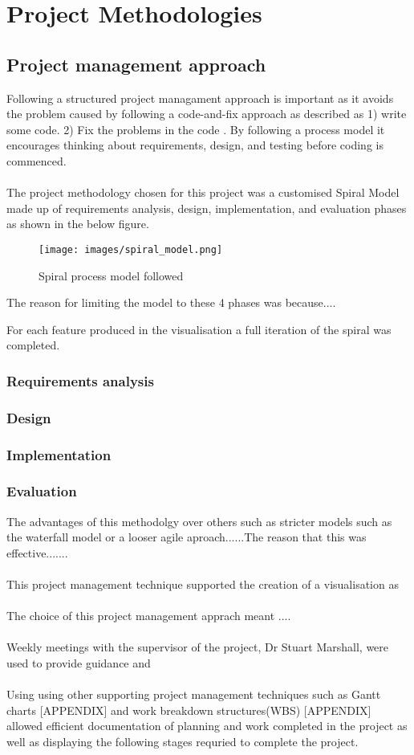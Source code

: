 
\chapter{Project Methodologies}\label{C:m}

\section{Project management approach}
Following a structured project managament approach is important as it avoids the problem caused by following a code-and-fix approach as described  as 1) write some code. 2) Fix the problems in the code \cite{boehm}. By following a process model it encourages thinking about requirements, design, and testing before coding is commenced. 
\\\\
The project methodology chosen for this project was a customised Spiral Model made up of requirements analysis, design, implementation, and evaluation phases as shown in the below figure.   
\begin{figure}[h!]
  \centering
      \texttt{[image: images/spiral\_model.png]}
  \caption{Spiral process model followed}
\end{figure}
The reason for limiting the model to these 4 phases was because....

For each feature produced in the visualisation a full iteration of the spiral was completed.
\subsection{Requirements analysis}
\subsection{Design}
\subsection{Implementation}
\subsection{Evaluation}
The advantages of this methodolgy over others such as stricter models such as the waterfall model or a looser agile aproach......The reason that this was effective.......
\\\\
This project management technique supported the creation of a visualisation as 
\\\\
The choice of this project management apprach meant ....
\\\\
Weekly meetings with the supervisor of the project, Dr Stuart Marshall, were used to provide guidance and 
\\\\
Using using other supporting project management techniques such as Gantt charts [APPENDIX] and work breakdown structures(WBS) [APPENDIX] allowed efficient documentation of planning and work completed in the project as well as displaying the following stages requried to complete the project.

